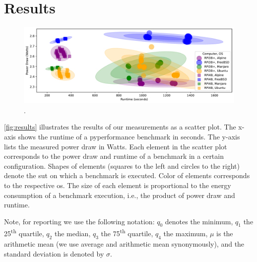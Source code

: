 \section{Results}\label{sec:results}




\begin{figure}[t]
    \centering
    \includegraphics[width=1\textwidth]{images/P_t_E_bagplot.pdf}
    \caption{.}
    \label{fig:results}
\end{figure}

\autoref{fig:results} illustrates the results of our measurements as a scatter plot.
The x-axis shows the runtime of a \gls{pyperformance} benchmark in seconds.
The y-axis lists the measured power draw in Watts.
Each element in the scatter plot corresponds to the power draw and runtime of a benchmark in a certain configuration.
Shapes of elements (squares to the left and circles to the right) denote the \gls{sut} on which a benchmark is executed.
Color of elements corresponds to the respective \gls{os}.
The size of each element is proportional to the energy consumption of a benchmark execution, i.e., the product of power draw and runtime.


Note, for reporting we use the following notation:
$q_{0}$ denotes the minimum,
$q_{1}$ the 25\textsuperscript{th} quartile,
$q_{2}$ the median,
$q_{3}$ the 75\textsuperscript{th} quartile,
$q_{4}$ the maximum,
$\mu$ is the arithmetic mean (we use average and arithmetic mean synonymously),
and the standard deviation is denoted by $\sigma$.

